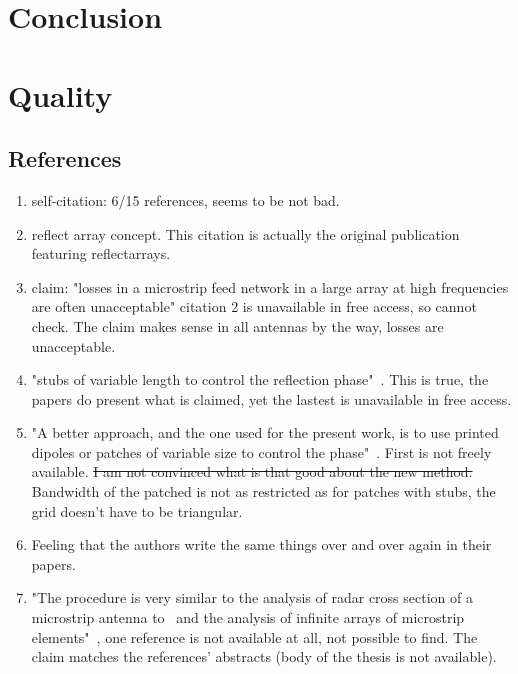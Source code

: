 \documentclass{article}
\begin{document}
    \section{Conclusion}\label{sec:conclusion}

    \section{Quality}\label{sec:quality}

    \subsection{References}\label{subsec:references}
    \begin{enumerate}
        \item self-citation: 6/15 references, seems to be not bad.
        \item reflect array concept\cite{berry.etal_1963nov}.
        This citation is actually the original publication featuring reflectarrays.
        \item claim: "losses in a microstrip feed network in a large array at high frequencies are often unacceptable" citation 2 is unavailable in free access, so cannot check.
        The claim makes sense in all antennas by the way, losses are unacceptable.
        \item "stubs of variable length to control the reflection phase"~\cite{munson.etal_1987aug,huang_1991jun,chang.huang_1992}.
        This is true, the papers do present what is claimed, yet the lastest is unavailable in free access.
        \item "A better approach, and the one used for the present work, is to use printed dipoles or patches of variable size to control the phase"~\cite{pozar.metzler_1993apr,targonski.pozar_1994jun}.
        First is not freely available.
        \sout{I am not convinced what is that good about the new method.}
        Bandwidth of the patched is not as restricted as for patches with stubs, the grid doesn't have to be triangular.
        \item Feeling that the authors write the same things over and over again in their papers.
        \item "The procedure is very similar to the analysis of radar cross section of a microstrip antenna to~\cite{pozar_1987jun} and the analysis of infinite arrays of microstrip elements"~\cite{harackiewicz_1990jan}, one reference is not available at all, not possible to find.
        The claim matches the references' abstracts (body of the thesis is not available).

\end{enumerate}
\end{document}
